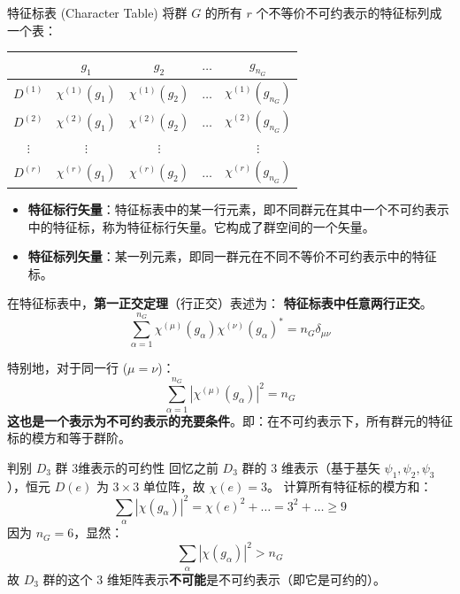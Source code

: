 \begin{definition}{特征标表 (Character Table)}
    将群 $G$ 的所有 $r$ 个不等价不可约表示的特征标列成一个表：
    \begin{center}
    \begin{tabular}{c|cccc}
        & $g_1$ & $g_2$ & $\dots$ & $g_{n_G}$ \\
        \hline
        $D^{(1)}$ & $\chi^{(1)}(g_1)$ & $\chi^{(1)}(g_2)$ & $\dots$ & $\chi^{(1)}(g_{n_G})$ \\
        $D^{(2)}$ & $\chi^{(2)}(g_1)$ & $\chi^{(2)}(g_2)$ & $\dots$ & $\chi^{(2)}(g_{n_G})$ \\
        $\vdots$ & $\vdots$ & $\vdots$ & & $\vdots$ \\
        $D^{(r)}$ & $\chi^{(r)}(g_1)$ & $\chi^{(r)}(g_2)$ & $\dots$ & $\chi^{(r)}(g_{n_G})$ \\
    \end{tabular}
    \end{center}
\end{definition}

\begin{note}
    \begin{itemize}
        \item \textbf{特征标行矢量}：特征标表中的某一行元素，即不同群元在其中一个不可约表示中的特征标，称为特征标行矢量。它构成了群空间的一个矢量。
        \item \textbf{特征标列矢量}：某一列元素，即同一群元在不同不等价不可约表示中的特征标。
    \end{itemize}
\end{note}

在特征标表中，\textbf{第一正交定理}（行正交）表述为：
\textbf{特征标表中任意两行正交}。
\begin{equation}
    \sum_{\alpha=1}^{n_G} \chi^{(\mu)}(g_\alpha) \chi^{(\nu)}(g_\alpha)^* = n_G \delta_{\mu\nu}
\end{equation}

特别地，对于同一行 ($\mu=\nu$)：
\begin{equation}
    \sum_{\alpha=1}^{n_G} |\chi^{(\mu)}(g_\alpha)|^2 = n_G
\end{equation}
\textbf{这也是一个表示为不可约表示的充要条件}。即：在不可约表示下，所有群元的特征标的模方和等于群阶。

\begin{example}{判别 $D_3$ 群 3维表示的可约性}
    回忆之前 $D_3$ 群的 3 维表示（基于基矢 $\psi_1, \psi_2, \psi_3$），恒元 $D(e)$ 为 $3 \times 3$ 单位阵，故 $\chi(e) = 3$。
    计算所有特征标的模方和：
    \begin{equation}
        \sum_\alpha |\chi(g_\alpha)|^2 = \chi(e)^2 + \dots = 3^2 + \dots \ge 9
    \end{equation}
    因为 $n_G = 6$，显然：
    \begin{equation}
        \sum_\alpha |\chi(g_\alpha)|^2 > n_G
    \end{equation}
    故 $D_3$ 群的这个 3 维矩阵表示\textbf{不可能}是不可约表示（即它是可约的）。
\end{example}

